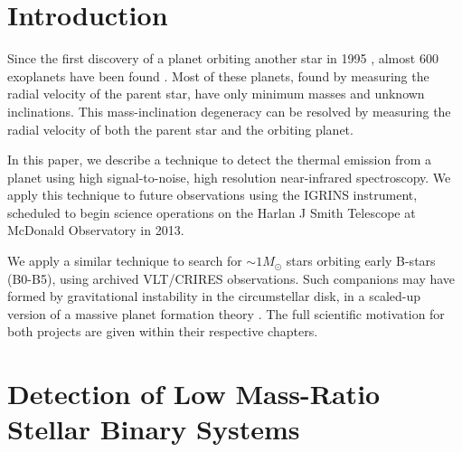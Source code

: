 \documentclass[11pt]{report}     %
\begin{document}
\tableofcontents               %

% 


\chapter{Introduction}           %
\label{Intro}                    %

Since the first discovery of a planet orbiting another star in 1995 \citep{Mayor1995}, almost 600 exoplanets have been found \citep[from exoplanets.org:][]{exoplanet}. Most of these planets, found by measuring the radial velocity of the parent star, have only minimum masses and unknown inclinations. This mass-inclination degeneracy can be resolved by measuring the radial velocity of both the parent star and the orbiting planet.

In this paper, we describe a technique to detect the thermal emission from a planet using high signal-to-noise, high resolution near-infrared spectroscopy. We apply this technique to future observations using the IGRINS instrument, scheduled to begin science operations on the Harlan J Smith Telescope at McDonald Observatory in 2013. 

We apply a similar technique to search for $\sim 1 M_{\odot}$ stars orbiting early B-stars (B0-B5), using archived VLT/CRIRES observations. Such companions may have formed by gravitational instability in the circumstellar disk, in a scaled-up version of a massive planet formation theory \citep[see e.g.][]{Kratter2006, Stamatellos2011}. The full scientific motivation for both projects are given within their respective chapters.




\chapter{Detection of Low Mass-Ratio Stellar Binary Systems}
\end{document}
